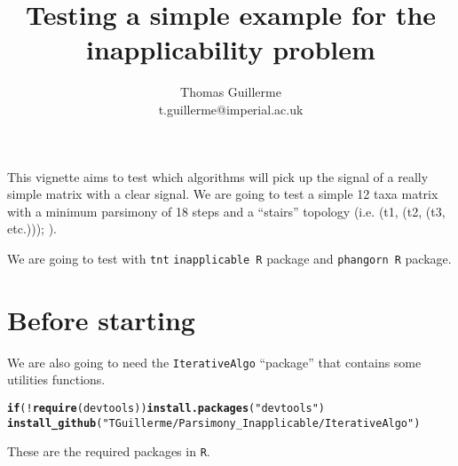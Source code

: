 \documentclass{article}\usepackage[]{graphicx}\usepackage[]{color}
\makeatletter
\newcommand{\hlstr}[1]{\textcolor[rgb]{0.192,0.494,0.8}{#1}}%
\newcommand{\hlopt}[1]{\textcolor[rgb]{0,0,0}{#1}}%
\newcommand{\hlstd}[1]{\textcolor[rgb]{0.345,0.345,0.345}{#1}}%
\newcommand{\hlkwa}[1]{\textcolor[rgb]{0.161,0.373,0.58}{\textbf{#1}}}%
\newcommand{\hlkwd}[1]{\textcolor[rgb]{0.737,0.353,0.396}{\textbf{#1}}}%
\newenvironment{kframe}{%
 \def\at@end@of@kframe{}%
 \ifinner\ifhmode%
  \def\at@end@of@kframe{\end{minipage}}%
  \begin{minipage}{\columnwidth}%
 \fi\fi%
 \def\FrameCommand##1{\hskip\@totalleftmargin \hskip-\fboxsep
 \colorbox{shadecolor}{##1}\hskip-\fboxsep
     \hskip-\linewidth \hskip-\@totalleftmargin \hskip\columnwidth}%
 \MakeFramed {\advance\hsize-\width
   \@totalleftmargin\z@ \linewidth\hsize
   \@setminipage}}%
 {\par\unskip\endMakeFramed%
 \at@end@of@kframe}
\newenvironment{knitrout}{}{} %
\makeatother
\begin{document}
\title{Testing a simple example for the inapplicability problem}

\author{Thomas Guillerme \\ t.guillerme@imperial.ac.uk}


\maketitle

This vignette aims to test which algorithms will pick up the signal of a really simple matrix with a clear signal.
We are going to test a simple 12 taxa matrix with a minimum parsimony of 18 steps and a ``stairs'' topology (i.e. (t1, (t2, (t3, etc.))); ).

We are going to test with \texttt{tnt} \texttt{inapplicable R} package and \texttt{phangorn R} package.

\section{Before starting}

We are also going to need the \texttt{IterativeAlgo} ``package'' that contains some utilities functions.

\begin{knitrout}
\color{fgcolor}\begin{kframe}
\begin{alltt}
\hlkwa{if}\hlstd{(}\hlopt{!}\hlkwd{require}\hlstd{(devtools))} \hlkwd{install.packages}\hlstd{(}\hlstr{"devtools"}\hlstd{)}
\hlkwd{install_github}\hlstd{(}\hlstr{"TGuillerme/Parsimony_Inapplicable/IterativeAlgo"}\hlstd{)}
\end{alltt}
\end{kframe}
\end{knitrout}

These are the required packages in \texttt{R}.
\end{document}
